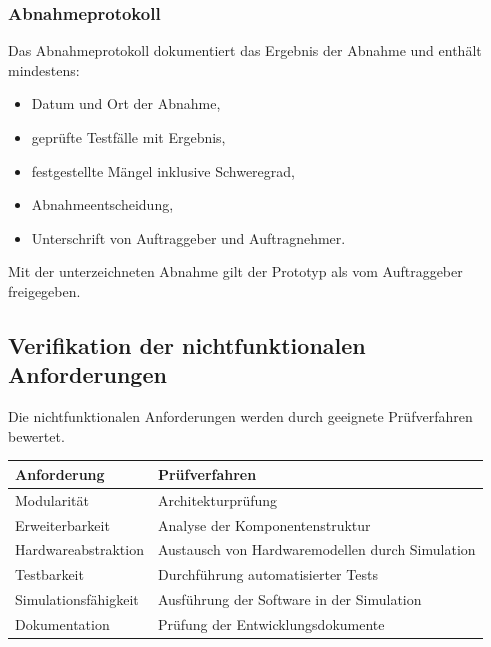 \documentclass[
  a4paper,
  12pt,
  DIV=12,        %
  parskip=half,  %
  headings=small %
]{scrartcl}
\theoremstyle{definition}
\providecommand{\tightlist}{%
  \setlength{\itemsep}{0pt}\setlength{\parskip}{0pt}}
\theoremstyle{definition}
\begin{document}
\subsubsection{Abnahmeprotokoll}\label{abnahmeprotokoll}

Das Abnahmeprotokoll dokumentiert das Ergebnis der Abnahme und enthält
mindestens:

\begin{itemize}
\tightlist
\item
  Datum und Ort der Abnahme,
\item
  geprüfte Testfälle mit Ergebnis,
\item
  festgestellte Mängel inklusive Schweregrad,
\item
  Abnahmeentscheidung,
\item
  Unterschrift von Auftraggeber und Auftragnehmer.
\end{itemize}

Mit der unterzeichneten Abnahme gilt der Prototyp als vom Auftraggeber
freigegeben.

\subsection{Verifikation der nichtfunktionalen
Anforderungen}\label{verifikation-der-nichtfunktionalen-anforderungen}

Die nichtfunktionalen Anforderungen werden durch geeignete Prüfverfahren
bewertet.

\begin{longtable}[]{@{}
  >{\raggedright\arraybackslash}p{}
  >{\raggedright\arraybackslash}p{}@{}}
\toprule\noalign{}
\begin{minipage}[b]{\linewidth}\raggedright
Anforderung
\end{minipage} & \begin{minipage}[b]{\linewidth}\raggedright
Prüfverfahren
\end{minipage} \\
\midrule\noalign{}
\endhead
\bottomrule\noalign{}
\endlastfoot
Modularität & Architekturprüfung \\
Erweiterbarkeit & Analyse der Komponentenstruktur \\
Hardwareabstraktion & Austausch von Hardwaremodellen durch Simulation \\
Testbarkeit & Durchführung automatisierter Tests \\
Simulationsfähigkeit & Ausführung der Software in der Simulation \\
Dokumentation & Prüfung der Entwicklungsdokumente \\
\end{longtable}
\end{document}
